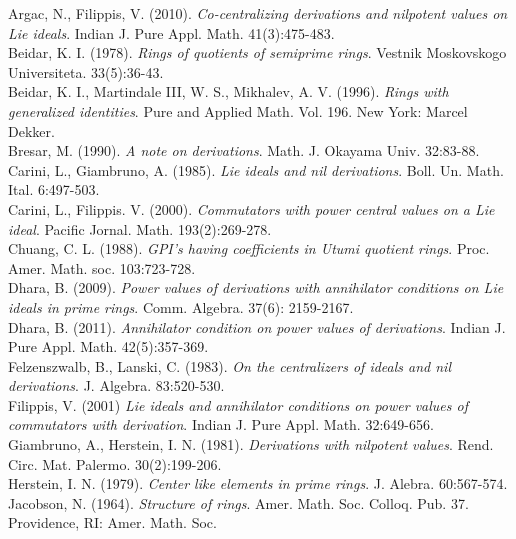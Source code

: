 \documentclass[12pt]{amsart}
\theoremstyle{definition}
\theoremstyle{remark}
\begin{document}
\begin{thebibliography}{10}
Argac, N., Filippis, V. (2010).
\emph{Co-centralizing derivations and nilpotent values on Lie ideals}.
Indian J. Pure Appl. Math. 41(3):475-483.\\
 Beidar, K. I. (1978).
 \emph{Rings of quotients of semiprime rings}.
 Vestnik Moskovskogo Universiteta.
 33(5):36-43.\\
 Beidar, K. I.,  Martindale III, W. S., Mikhalev, A. V. (1996).
 \emph{Rings with generalized identities}.
 Pure and Applied Math. Vol. 196. New York: Marcel Dekker.\\
 Bresar, M. (1990).
 \emph{A note on derivations}.
 Math. J. Okayama Univ. 32:83-88.\\
 Carini, L., Giambruno, A. (1985).
 \emph{Lie ideals and nil derivations}.
 Boll. Un. Math. Ital. 6:497-503.\\
 Carini, L., Filippis. V. (2000).
 \emph{Commutators with power central values on a Lie ideal}.
 Pacific Jornal. Math. 193(2):269-278.\\
 Chuang,  C. L. (1988).
 \emph{GPI's having coefficients in Utumi quotient rings}.
 Proc. Amer. Math. soc. 103:723-728.\\
 Dhara, B. (2009).
 \emph{Power values of derivations with annihilator conditions on Lie ideals in prime rings}.
 Comm. Algebra. 37(6): 2159-2167.\\
 Dhara, B. (2011).
 \emph{Annihilator condition on power values of derivations}.
 Indian J. Pure Appl. Math. 42(5):357-369.\\
 Felzenszwalb, B., Lanski, C. (1983).
 \emph{On the centralizers of ideals and nil derivations}.
 J. Algebra. 83:520-530.\\
 Filippis, V. (2001)
 \emph{Lie ideals and annihilator conditions on power values of commutators with derivation}.
 Indian J. Pure Appl. Math. 32:649-656.\\
 Giambruno, A., Herstein, I. N. (1981).
 \emph{Derivations with nilpotent values}.
 Rend. Circ. Mat. Palermo. 30(2):199-206.\\
  Herstein, I. N. (1979).
  \emph{Center like elements in prime rings}.
  J. Alebra. 60:567-574. \\
 Jacobson, N.  (1964).
 \emph{Structure of rings}.
 Amer. Math. Soc. Colloq. Pub. 37. Providence, RI: Amer. Math. Soc. \\

\end{thebibliography}
\end{document}
